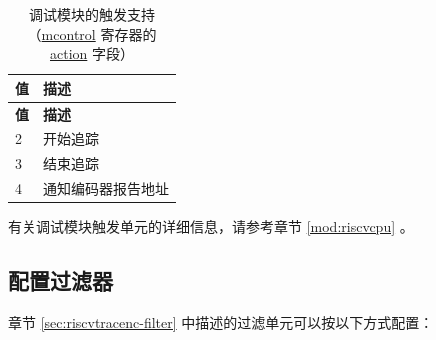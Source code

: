 \documentclass[main\_\_CN.tex]{subfiles}
\begin{document}
\begin{itemize}
            \begin{longtable}[c]{ |l|l| }
    \caption{调试模块的触发支持（\hyperref[regdesc:MCONTROL]{mcontrol} 寄存器的 \hyperref[fielddesc:MCONTROLACTION]{action} 字段）}
    \label{tab:debug_mcontrol}
    \\\hline\rowcolor{lightgray}
    \textbf{值} & \textbf{描述} \\\hline
    \endfirsthead
    \rowcolor{lightgray}
    \textbf{值} & \textbf{描述} \\\hline
    \endhead
    \endfoot
    \endlastfoot

    2 & 开始追踪 \\\hline
    3 & 结束追踪 \\\hline
    4 & 通知编码器报告地址 \\\hline

    \end{longtable}
\end{itemize}

有关调试模块触发单元的详细信息，请参考章节 \ref{mod:riscvcpu} \textit{}。


\subsection{配置过滤器}

章节 \ref{sec:riscvtracenc-filter} 中描述的过滤单元可以按以下方式配置：
\end{document}
